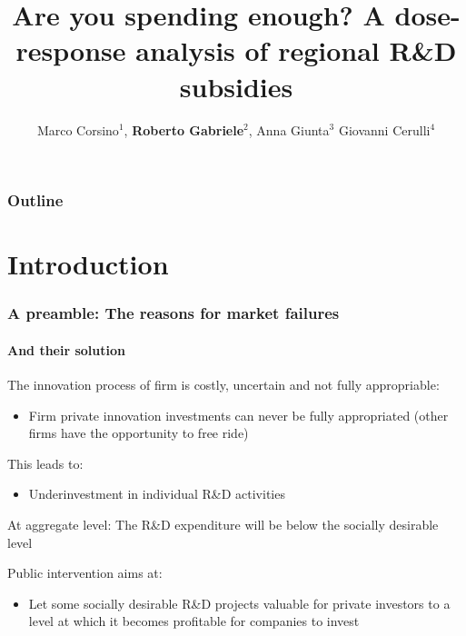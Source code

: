 \documentclass[10pt,handout,xcolor=pdftex,dvipsnames,table]{beamer}
\title[Dose-response analysis] %
{ 
Are you spending enough? A dose-response analysis of regional R\&D subsidies}
\subtitle{
}
\author[Gabriele R.] %
{Marco Corsino$^1$, %
{\bf Roberto Gabriele$^2$}, %
Anna Giunta$^3$
Giovanni Cerulli$^4$%
}
\institute[AY 2024/2025] %
{$^1$ Department of Management, University of Milano Bicocca

$^2$ Department of  Economics and Management, University  of  Trento


$^3$ Department of Economics, University Roma Tre
$^4$ IRCrES CNR, Roma


}
\date[3/2/2025] %
{\footnotesize Methods and Applications for Empirical Economics Academic Year 2024/2025, 

Ph.D. Programme in Economics and Finance, UniTn \& UniBZ}
\begin{document}
{
\begin{frame}
\titlepage


\end{frame}
}
\begin{frame}
  \frametitle{Outline}
  \tableofcontents
\end{frame}
\section{Introduction}
\begin{frame}
\frametitle{A preamble: The reasons for market failures}
\framesubtitle{And their solution}
\begin{block} {The innovation process of firm is costly, uncertain and not fully appropriable:}
	\begin{itemize}
		\item Firm private innovation investments can never be fully appropriated  (other firms have the opportunity to free ride)
	\end{itemize}
\end{block}
	This leads to:
	\begin{itemize}
 		\item  Underinvestment in individual R\&D activities
	\end{itemize}
\begin{block} {At aggregate level:} 
	The R\&D expenditure will be below the socially desirable level
\end{block}
\begin{block} {Public intervention aims at:} 
	\begin{itemize}
		\item Let some socially  desirable R\&D projects valuable for private investors to a level at which it becomes profitable for companies to invest
	\end{itemize}
\end{block}
\end{frame}
\end{document}
